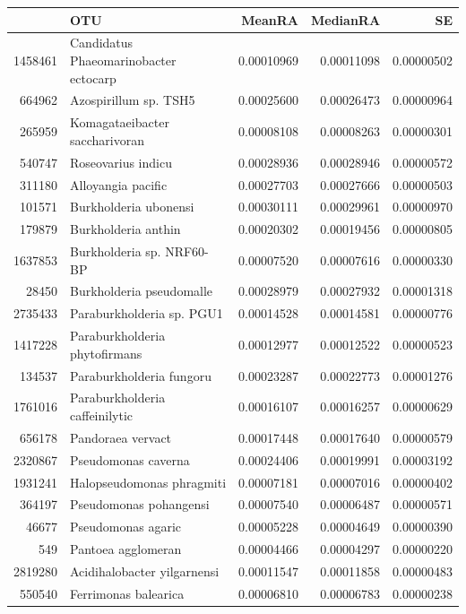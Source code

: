 \documentclass{article}
\begin{document}
\begin{table}[ht]
\centering
\begin{tabular}{rlrrr}
  \hline
 & OTU & MeanRA & MedianRA & SE \\ 
  \hline
1458461 & Candidatus Phaeomarinobacter ectocarp & 0.00010969 & 0.00011098 & 0.00000502 \\ 
  664962 & Azospirillum sp. TSH5 & 0.00025600 & 0.00026473 & 0.00000964 \\ 
  265959 & Komagataeibacter saccharivoran & 0.00008108 & 0.00008263 & 0.00000301 \\ 
  540747 & Roseovarius indicu & 0.00028936 & 0.00028946 & 0.00000572 \\ 
  311180 & Alloyangia pacific & 0.00027703 & 0.00027666 & 0.00000503 \\ 
  101571 & Burkholderia ubonensi & 0.00030111 & 0.00029961 & 0.00000970 \\ 
  179879 & Burkholderia anthin & 0.00020302 & 0.00019456 & 0.00000805 \\ 
  1637853 & Burkholderia sp. NRF60-BP & 0.00007520 & 0.00007616 & 0.00000330 \\ 
  28450 & Burkholderia pseudomalle & 0.00028979 & 0.00027932 & 0.00001318 \\ 
  2735433 & Paraburkholderia sp. PGU1 & 0.00014528 & 0.00014581 & 0.00000776 \\ 
  1417228 & Paraburkholderia phytofirmans & 0.00012977 & 0.00012522 & 0.00000523 \\ 
  134537 & Paraburkholderia fungoru & 0.00023287 & 0.00022773 & 0.00001276 \\ 
  1761016 & Paraburkholderia caffeinilytic & 0.00016107 & 0.00016257 & 0.00000629 \\ 
  656178 & Pandoraea vervact & 0.00017448 & 0.00017640 & 0.00000579 \\ 
  2320867 & Pseudomonas caverna & 0.00024406 & 0.00019991 & 0.00003192 \\ 
  1931241 & Halopseudomonas phragmiti & 0.00007181 & 0.00007016 & 0.00000402 \\ 
  364197 & Pseudomonas pohangensi & 0.00007540 & 0.00006487 & 0.00000571 \\ 
  46677 & Pseudomonas agaric & 0.00005228 & 0.00004649 & 0.00000390 \\ 
  549 & Pantoea agglomeran & 0.00004466 & 0.00004297 & 0.00000220 \\ 
  2819280 & Acidihalobacter yilgarnensi & 0.00011547 & 0.00011858 & 0.00000483 \\ 
  550540 & Ferrimonas balearica & 0.00006810 & 0.00006783 & 0.00000238 \\ 

\end{tabular}
\end{table}
\end{document}
